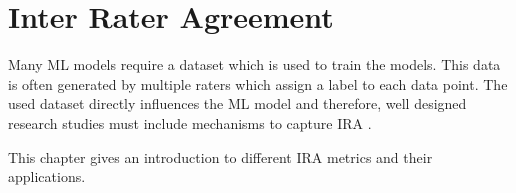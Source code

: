 \section{Inter Rater Agreement}
\label{chp:fundamentals:sec:inter_rater_agreement}
Many \ac{ML} models require a dataset which is used to train the models.
This data is often generated by multiple raters which assign a label to each data point.
The used dataset directly influences the \ac{ML} model \parencite{Gray:2011} and therefore, well designed research studies must include mechanisms to capture \ac{IRA} \parencite{McHugh:2012}.

This chapter gives an introduction to different \ac{IRA} metrics and their applications.





